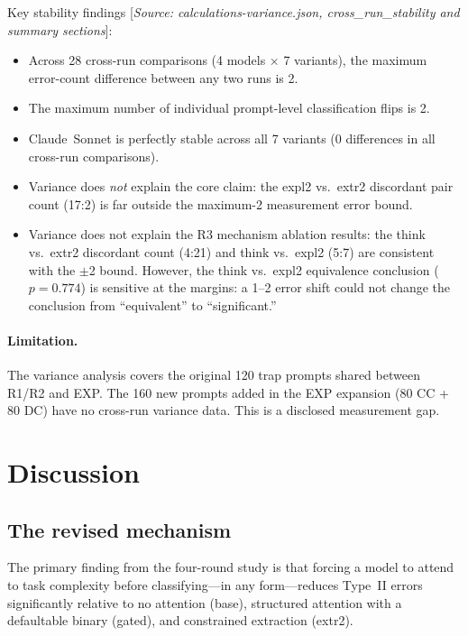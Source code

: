 \documentclass[11pt,a4paper]{article}
\begin{document}
Key stability findings [\emph{Source: calculations-variance.json,
cross\_run\_stability and summary sections}]:
\begin{itemize}[noitemsep]
  \item Across 28 cross-run comparisons (4 models $\times$ 7 variants),
    the maximum error-count difference between any two runs is 2.
  \item The maximum number of individual prompt-level classification
    flips is 2.
  \item Claude~Sonnet is perfectly stable across all 7 variants
    (0 differences in all cross-run comparisons).
  \item Variance does \emph{not} explain the core claim: the expl2
    vs.\ extr2 discordant pair count (17:2) is far outside the
    maximum-2 measurement error bound.
  \item Variance does not explain the R3 mechanism ablation results:
    the think vs.\ extr2 discordant count (4:21) and think vs.\ expl2
    (5:7) are consistent with the $\pm$2 bound.  However, the think vs.\
    expl2 equivalence conclusion ($p = 0.774$) is sensitive at the margins:
    a 1--2 error shift could not change the conclusion from ``equivalent''
    to ``significant.''
\end{itemize}

\paragraph{Limitation.}
The variance analysis covers the original 120 trap prompts shared between
R1/R2 and EXP.  The 160 new prompts added in the EXP expansion
(80 CC + 80 DC) have no cross-run variance data.  This is a disclosed
measurement gap.

\section{Discussion}
\label{sec:discussion}

\subsection{The revised mechanism}
\label{sec:mechanism}

The primary finding from the four-round study is that forcing a model to
attend to task complexity before classifying---in any form---reduces Type~II
errors significantly relative to no attention (base), structured attention
with a defaultable binary (gated), and constrained extraction (extr2).
\end{document}
